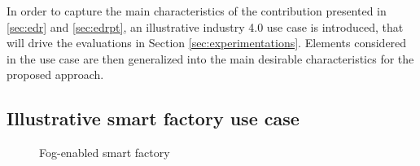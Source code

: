 \documentclass[sw]{iosart2x}
\begin{document}
In order to capture the main characteristics of the contribution presented in \textsection \ref{sec:edr} and \textsection \ref{sec:edrpt}, an illustrative industry 4.0 use case is introduced, that will drive the evaluations in Section \textsection \ref{sec:experimentations}.
Elements considered in the use case are then generalized into the main desirable characteristics for the proposed approach.

\subsection{Illustrative smart factory use case}
\label{sec:distribution_use_case}

\begin{figure}
	\centering
	\caption{Fog-enabled smart factory}
	\label{fig:usecase}
\end{figure}
\end{document}
